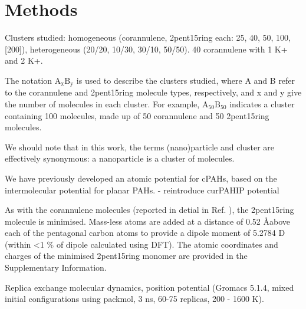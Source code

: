 





\section{Methods}
Clusters studied: homogeneous (corannulene, 2pent15ring each: 25, 40, 50, 100, [200]), heterogeneous (20/20, 10/30, 30/10, 50/50).
40 corannulene with 1 K+ and 2 K+.

The notation $\text{A}_{\text{x}}\text{B}_{\text{y}}$ is used to describe the clusters studied, where A and B refer to the corannulene and 2pent15ring molecule types, respectively, and x and y give the number of molecules in each cluster. For example, $\text{A}_{\text{50}}\text{B}_{\text{50}}$ indicates a cluster containing 100 molecules, made up of 50 corannulene and 50 2pent15ring molecules.  

We should note that in this work, the terms (nano)particle and cluster are effectively synonymous: a nanoparticle is a cluster of molecules.

We have previously developed an atomic potential for cPAHs, based on the intermolecular potential for planar PAHs. 
- reintroduce curPAHIP potential

As with the corannulene molecules (reported in detial in Ref. \cite{bowal2019ion}), the 2pent15ring molecule is minimised. Mass-less atoms are added at a distance of 0.52 \AA above each of the pentagonal carbon atoms to provide a dipole moment of 5.2784 D (within <1 \% of dipole calculated using DFT). The atomic coordinates and charges of the minimised 2pent15ring monomer are provided in the Supplementary Information.

Replica exchange molecular dynamics, position potential (Gromacs 5.1.4, mixed initial configurations using packmol, 3 ns, 60-75 replicas, 200 - 1600 K).

